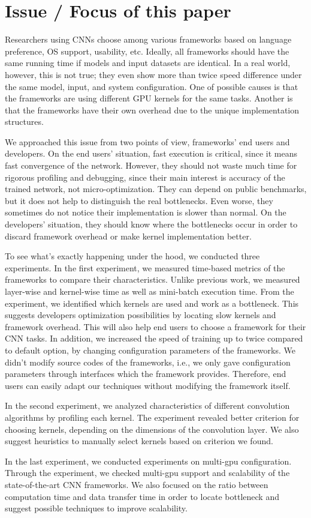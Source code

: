 \section{Issue / Focus of this paper}
Researchers using CNNs choose among various frameworks based on language preference, OS support, usability, etc.
Ideally, all frameworks should have the same running time if models and input datasets are identical.
In a real world, however, this is not true; they even show more than twice speed difference under the same model, input, and system configuration\cite{DBLP:journals/corr/BahrampourRSS15,DBLP:journals/corr/ShiWXC16}.
One of possible causes is that the frameworks are using different GPU kernels for the same tasks.
Another is that the frameworks have their own overhead due to the unique implementation structures.

We approached this issue from two points of view, frameworks' end users and developers.
On the end users' situation, fast execution is critical, since it means fast convergence of the network.
However, they should not waste much time for rigorous profiling and debugging, since their main interest is accuracy of the trained network, not micro-optimization.
They can depend on public benchmarks, but it does not help to distinguish the real bottlenecks.
Even worse, they sometimes do not notice their implementation is slower than normal.
On the developers' situation, they should know where the bottlenecks occur in order to discard framework overhead or make kernel implementation better.

To see what's exactly happening under the hood, we conducted three experiments.
In the first experiment, we measured time-based metrics of the frameworks to compare their characteristics.
Unlike previous work, we measured layer-wise and kernel-wise time as well as mini-batch execution time.
From the experiment, we identified which kernels are used and work as a bottleneck.
This suggests developers optimization possibilities by locating slow kernels and framework overhead.
This will also help end users to choose a framework for their CNN tasks.
In addition, we increased the speed of training up to twice compared to default option, by changing configuration parameters of the frameworks.
We didn't modify source codes of the frameworks, i.e., we only gave configuration parameters through interfaces which the framework provides.
Therefore, end users can easily adapt our techniques without modifying the framework itself.

In the second experiment, we analyzed characteristics of different convolution algorithms by profiling each kernel.
The experiment revealed better criterion for choosing kernels, depending on the dimensions of the convolution layer.
We also suggest heuristics to manually select kernels based on criterion we found.

In the last experiment, we conducted experiments on multi-gpu configuration.
Through the experiment, we checked multi-gpu support and scalability of the state-of-the-art CNN frameworks.
We also focused on the ratio between computation time and data transfer time in order to locate bottleneck and suggest possible techniques to improve scalability.

